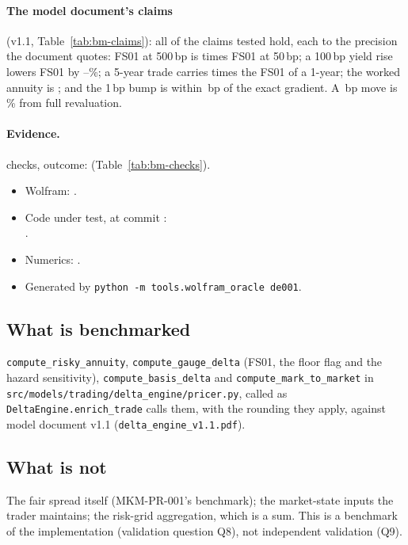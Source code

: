 \documentclass[11pt,a4paper]{article}
\begin{document}
\paragraph{The model document's claims} (v1.1, Table~\ref{tab:bm-claims}): all
\bmClaimsMet{} of the \bmClaimsTested{} claims tested hold, each to the precision the
document quotes: FS01 at 500\,bp is \bmLinear{} times FS01 at 50\,bp; a 100\,bp
yield rise lowers FS01 by \bmYieldLow--\bmYieldHigh\%; a 5-year trade carries
\bmTenor{} times the FS01 of a 1-year; the worked annuity is \bmHand; and the 1\,bp
bump is within \bmFd\,bp of the exact gradient. A \bmMove\,bp move is
\bmConvexity\% from full revaluation.

\paragraph{Evidence.} \bmChecks{} checks, outcome: \bmOutcome{}
(Table~\ref{tab:bm-checks}).
\begin{itemize}[leftmargin=*,nosep]
\item Wolfram: \bmWolfram{}\bmWolframVia.
\item Code under test, at commit \bmCodeCommit{}\bmCodeDirty:\\ \bmCodeFiles.
\item Numerics: \bmNumerics.
\item Generated \bmGenerated{} by \texttt{python -m tools.wolfram\_oracle de001}.
\end{itemize}

\mkmpurpose

\subsection{What is benchmarked}
\texttt{compute\_risky\_annuity}, \texttt{compute\_gauge\_delta} (FS01, the floor
flag and the hazard sensitivity), \texttt{compute\_basis\_delta} and
\texttt{compute\_mark\_to\_market} in \texttt{src/models/trading/delta\_engine/pricer.py},
called as \texttt{DeltaEngine.enrich\_trade} calls them, with the rounding they apply,
against model document v1.1 (\texttt{delta\_engine\_v1.1.pdf}).

\subsection{What is not}
The fair spread itself (MKM-PR-001's benchmark); the market-state inputs the trader
maintains; the risk-grid aggregation, which is a sum. This is a benchmark
of the implementation (validation question Q8), not independent validation (Q9).
\end{document}
